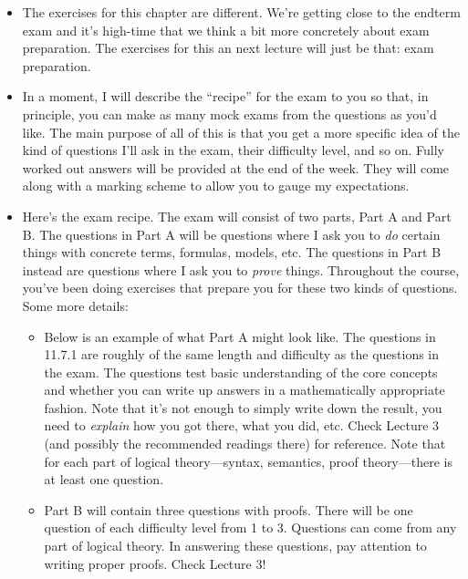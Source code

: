 \begin{itemize}
\item The exercises for this chapter are different. We're getting
 close to the endterm exam and it's high-time that we think a bit more
 concretely about exam preparation. The exercises for this an next lecture will just be that: exam preparation.

 \item In a moment, I will describe the ``recipe'' for the exam to you
so that, in principle, you can make as many mock exams from the
questions as you'd like. The main purpose of all of this is that you
get a more specific idea of the kind of questions I'll ask in the
exam, their difficulty level, and so on. Fully worked out answers will be
provided at the end of the week. They will come along with a marking
scheme to allow you to gauge my expectations.

\item Here's the exam recipe. The exam will consist of two parts, Part A and Part
  B. The questions in Part A will be questions where I ask you to
  \emph{do} certain things with concrete terms, formulas, models,
  etc. The questions in Part B instead are questions where I ask you
  to \emph{prove} things. Throughout the course, you've been
  doing exercises that prepare you for these two kinds of
  questions. Some more details:

  \begin{itemize}

    \item Below is an example of what Part A might look like. The
      questions in 11.7.1 are roughly of the same length and
      difficulty as the questions in the exam. The questions test
      basic understanding of the core concepts and whether you can
      write up answers in a mathematically appropriate fashion. Note
      that it's not enough to simply write down the result, you need
      to \emph{explain} how you got there, what you did, etc. Check
      Lecture 3 (and possibly the recommended readings there) for
      reference. Note that for each part of logical theory---syntax,
      semantics, proof theory---there is at least one question.

    \item Part B will contain three questions with proofs. There will
      be one question of each difficulty level from 1 to 3. Questions
      can come from any part of logical theory. In answering these
      questions, pay attention to writing proper proofs. Check Lecture
      3! 


\end{itemize}
\end{itemize}
